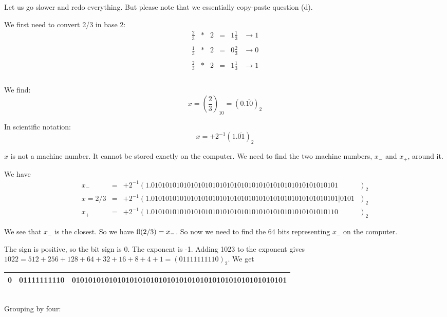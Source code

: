 \documentclass[pdftex,11pt]{article}
\begin{document}
\begin{enumerate}
Let us go slower and redo everything. But please note that we essentially copy-paste question (d).

We first need to convert 2/3 in base 2:
$$
\begin{array}{rcrccc}
\frac{2}{3}& *& 2   & = & 1\frac{1}{3}&    \rightarrow     1  \\\\
\frac{1}{3}& *& 2   & = & 0\frac{2}{3}&    \rightarrow     0  \\\\
\hline
\frac{2}{3}& *& 2   & = & 1\frac{1}{3}&    \rightarrow     1  \\\\
\end{array}
$$

We find:
$$x = (\frac{2}{3})_{10} = (0.\overline{10})_2 $$

In scientific notation:
$$x = + 2^{-1} (1.\overline{01})_2 $$

$x$ is not a machine number. It cannot be stored exactly on the computer. We
need to find the two machine numbers, $x_-$ and $x_+$, around it.

We have
\begin{eqnarray}
 \nonumber x_-       & = &  + 2^{-1} ( 1.0101010101010101010101010101010101010101010101010101\phantom{|0101}~~~)_2\\
 \nonumber x = 2/3   & = &  + 2^{-1} ( 1.0101010101010101010101010101010101010101010101010101|0101~~~)_2\\ 
 \nonumber x_+       & = &  + 2^{-1} ( 1.0101010101010101010101010101010101010101010101010110\phantom{|0101}~~~)_2
\end{eqnarray}

We see that $x_-$ is the closest. So we have $\textmd{fl}(2/3) = x_-$. So now we need to find the 
64 bits representing $x_-$ on the computer.

The sign is positive, so the bit sign is $0$.
The exponent is -1. Adding 1023 to the exponent gives $1022 =
512+256+128+64+32+16+8+4+1 = (01111111110)_2.$
We get\\

\begin{tabular}{|c|c|c|}
\hline
0 & 01111111110 & 0101010101010101010101010101010101010101010101010101 \\
\hline
\end{tabular}\\

Grouping by four:\\


\end{enumerate}
\end{document}

